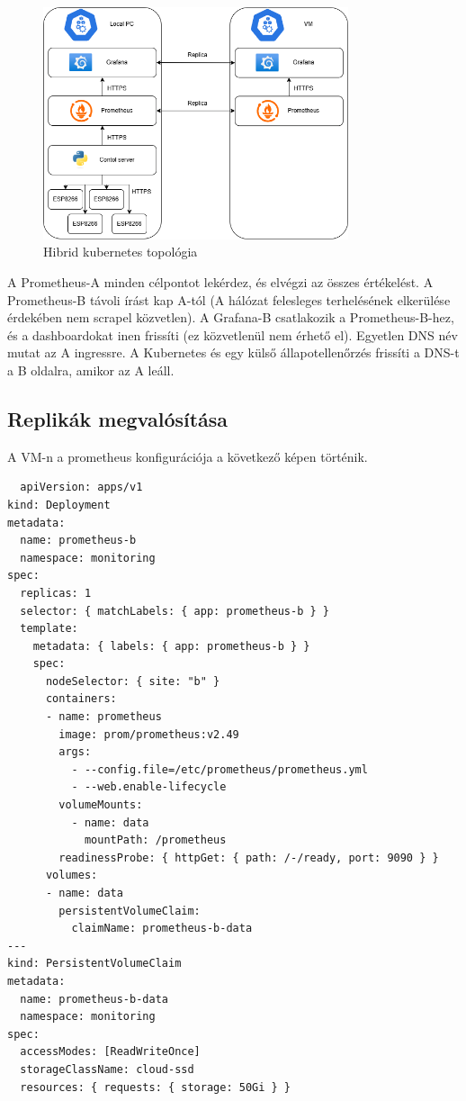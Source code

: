 \begin{figure}[!ht]
  \centering
  \includegraphics[width=0.8\textwidth, keepaspectratio]{figures/kubernetes.png}
  \caption{Hibrid kubernetes topológia}
\end{figure}

A Prometheus-A minden célpontot lekérdez, és elvégzi az összes értékelést.
A Prometheus-B távoli írást kap A-tól (A hálózat felesleges terhelésének 
elkerülése érdekében nem scrapel közvetlen).
A Grafana-B csatlakozik a Prometheus-B-hez, és a dashboardokat inen frissíti 
(ez közvetlenül nem érhető el).
Egyetlen DNS név mutat az A ingressre. A Kubernetes és egy külső állapotellenőrzés 
frissíti a DNS-t a B oldalra, amikor az A leáll.

\subsection{Replikák megvalósítása}

A VM-n a prometheus konfigurációja a következő képen történik.

\begin{lstlisting}
  apiVersion: apps/v1
kind: Deployment
metadata:
  name: prometheus-b
  namespace: monitoring
spec:
  replicas: 1
  selector: { matchLabels: { app: prometheus-b } }
  template:
    metadata: { labels: { app: prometheus-b } }
    spec:
      nodeSelector: { site: "b" }
      containers:
      - name: prometheus
        image: prom/prometheus:v2.49
        args:
          - --config.file=/etc/prometheus/prometheus.yml
          - --web.enable-lifecycle
        volumeMounts:
          - name: data
            mountPath: /prometheus
        readinessProbe: { httpGet: { path: /-/ready, port: 9090 } }
      volumes:
      - name: data
        persistentVolumeClaim:
          claimName: prometheus-b-data
---
kind: PersistentVolumeClaim
metadata:
  name: prometheus-b-data
  namespace: monitoring
spec:
  accessModes: [ReadWriteOnce]
  storageClassName: cloud-ssd
  resources: { requests: { storage: 50Gi } }
\end{lstlisting}

